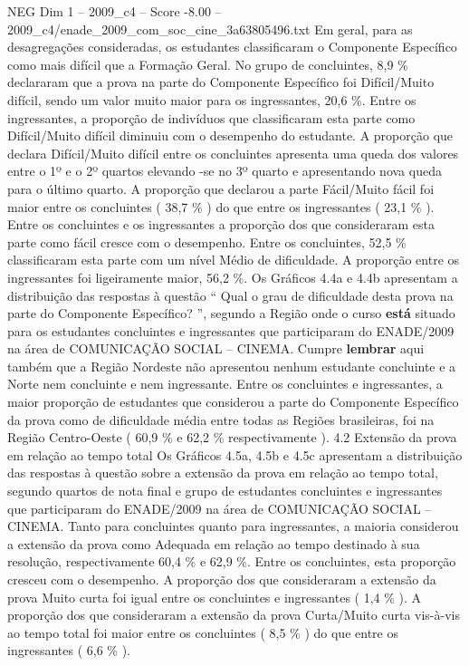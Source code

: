 \begin{textsample}{NEG Dim 1 – 2009\_c4 – Score -8.00 – 2009\_c4/enade\_2009\_com\_soc\_cine\_3a63805496.txt}
Em geral, para as desagregações consideradas, os estudantes classificaram o Componente Específico como mais difícil que a Formação Geral.
No grupo de concluintes, 8,9 \% declararam que a prova na parte do Componente Específico foi Difícil/Muito difícil, sendo um valor muito maior para os ingressantes, 20,6 \%.
Entre os ingressantes, a proporção de indivíduos que classificaram esta parte como Difícil/Muito difícil diminuiu com o desempenho do estudante.
A proporção que declara Difícil/Muito difícil entre os concluintes apresenta uma queda dos valores entre o 1º e o 2º quartos elevando -se no 3º quarto e apresentando nova queda para o último quarto.
A proporção que declarou a parte Fácil/Muito fácil foi maior entre os concluintes ( 38,7 \% ) do que entre os ingressantes ( 23,1 \% ).
Entre os concluintes e os ingressantes a proporção dos que consideraram esta parte como fácil cresce com o desempenho.
Entre os concluintes, 52,5 \% classificaram esta parte com um nível Médio de dificuldade.
A proporção entre os ingressantes foi ligeiramente maior, 56,2 \%.
Os Gráficos 4.4a e 4.4b apresentam a distribuição das respostas à questão “ Qual o grau de dificuldade desta prova na parte do Componente Específico? ”, segundo a Região onde o curso \textbf{está} situado para os estudantes concluintes e ingressantes que participaram do ENADE/2009 na área de COMUNICAÇÃO SOCIAL – CINEMA.
Cumpre \textbf{lembrar} aqui também que a Região Nordeste não apresentou nenhum estudante concluinte e a Norte nem concluinte e nem ingressante.
Entre os concluintes e ingressantes, a maior proporção de estudantes que considerou a parte do Componente Específico da prova como de dificuldade média entre todas as Regiões brasileiras, foi na Região Centro-Oeste ( 60,9 \% e 62,2 \% respectivamente ). 4.2 Extensão da prova em relação ao tempo total Os Gráficos 4.5a, 4.5b e 4.5c apresentam a distribuição das respostas à questão sobre a extensão da prova em relação ao tempo total, segundo quartos de nota final e grupo de estudantes concluintes e ingressantes que participaram do ENADE/2009 na área de COMUNICAÇÃO SOCIAL – CINEMA.
Tanto para concluintes quanto para ingressantes, a maioria considerou a extensão da prova como Adequada em relação ao tempo destinado à sua resolução, respectivamente 60,4 \% e 62,9 \%.
Entre os concluintes, esta proporção cresceu com o desempenho.
A proporção dos que consideraram a extensão da prova Muito curta foi igual entre os concluintes e ingressantes ( 1,4 \% ).
A proporção dos que consideraram a extensão da prova Curta/Muito curta vis-à-vis ao tempo total foi maior entre os concluintes ( 8,5 \% ) do que entre os ingressantes ( 6,6 \% ).

\end{textsample}
